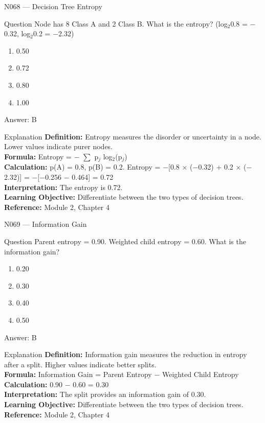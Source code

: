 \documentclass[aspectratio=169,8pt]{beamer}
\begin{document}
	\begin{frame}{N068 --- Decision Tree Entropy}
		\begin{block}{Question}
			Node has 8 Class A and 2 Class B. What is the entropy? (log$_{2}$0.8 = $-$0.32, log$_{2}$0.2 = $-$2.32)
			\begin{enumerate}
				\item 0.50
				\item 0.72
				\item 0.80
				\item 1.00
			\end{enumerate}
		\end{block}
		\begin{exampleblock}{Answer: B}\end{exampleblock}
		\begin{block}{Explanation}
			\textbf{Definition:} Entropy measures the disorder or uncertainty in a node. Lower values indicate purer nodes.\\
			\textbf{Formula:} Entropy = $-$ $\sum$ p$_{j}$ log$_{2}$(p$_{j}$)\\
			\textbf{Calculation:} p(A) = 0.8, p(B) = 0.2. Entropy = $-$[0.8 $\times$ ($-$0.32) + 0.2 $\times$ ($-$2.32)] = $-$[$-$0.256 $-$ 0.464] = 0.72\\
			\textbf{Interpretation:} The entropy is 0.72.\\
			\textbf{Learning Objective:} Differentiate between the two types of decision trees.\\
			\textbf{Reference:} Module 2, Chapter 4
		\end{block}
	\end{frame}
	
	\begin{frame}{N069 --- Information Gain}
		\begin{block}{Question}
			Parent entropy = 0.90. Weighted child entropy = 0.60. What is the information gain?
			\begin{enumerate}
				\item 0.20
				\item 0.30
				\item 0.40
				\item 0.50
			\end{enumerate}
		\end{block}
		\begin{exampleblock}{Answer: B}\end{exampleblock}
		\begin{block}{Explanation}
			\textbf{Definition:} Information gain measures the reduction in entropy after a split. Higher values indicate better splits.\\
			\textbf{Formula:} Information Gain = Parent Entropy $-$ Weighted Child Entropy\\
			\textbf{Calculation:} 0.90 $-$ 0.60 = 0.30\\
			\textbf{Interpretation:} The split provides an information gain of 0.30.\\
			\textbf{Learning Objective:} Differentiate between the two types of decision trees.\\
			\textbf{Reference:} Module 2, Chapter 4
		\end{block}
	\end{frame}
	
\end{document}
